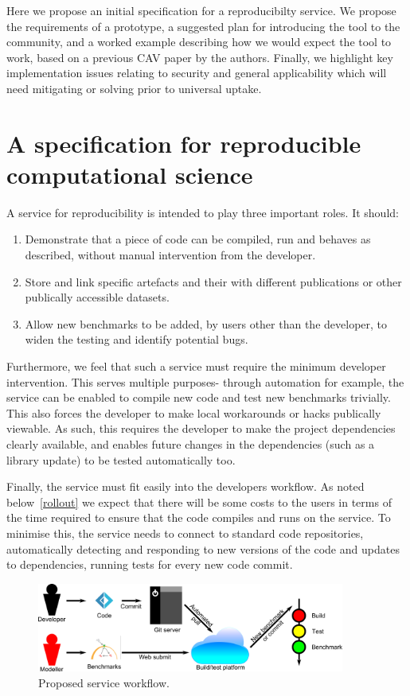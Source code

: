\documentclass{llncs}
\begin{document}
Here we propose an initial specification for a reproducibilty service. We propose the
requirements of a prototype, a suggested plan for introducing the tool to the community,
and a worked example describing how we would expect the tool to work, based on a previous
CAV paper by the authors. Finally, we highlight key implementation issues relating to
security and general applicability which will need mitigating or solving prior to universal
uptake.

\section{A specification for reproducible computational science}\label{spec}

A service for reproducibility is intended to play three important roles. It should:
\begin{enumerate}
	\item Demonstrate that a piece of code can be compiled, run and behaves as described,
		without manual intervention from the developer.
	\item Store and link specific artefacts and their with different publications
		or other publically accessible datasets.
	\item Allow new benchmarks to be added, by users other than the developer, to 
		widen the testing and identify potential bugs.
\end{enumerate}
 
Furthermore, we feel that such a service must require the minimum developer intervention.
This serves multiple purposes- through automation for example, the service can be enabled to compile 
new code and test new benchmarks trivially. This also forces the developer to make local
workarounds or hacks publically viewable. As such, this requires the developer to make the 
project dependencies clearly available, and enables future changes in the dependencies 
(such as a library update) to be tested automatically too. 

Finally, the service must fit easily into the developers workflow. As noted below~\ref{rollout}
we expect that there will be some costs to the users in terms of the time required
to ensure that the code compiles and runs on the service. To minimise this, the service
needs to connect to standard code repositories, automatically detecting and responding to
new versions of the code and updates to dependencies, running tests for every new code commit.

\begin{figure}[h!]
	\centering
	\includegraphics[width=0.9\textwidth]{Workflow}
	\caption{Proposed service workflow.}
	\label{schematic}
\end{figure}
	
\end{document}
